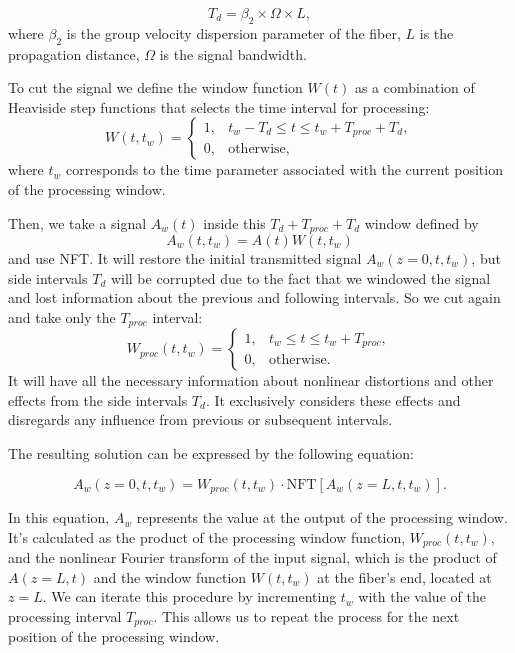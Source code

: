 \begin{equation}
    T_d = \beta_2 \times \Omega \times L {,}
\end{equation}
where $\beta_2$ is the group velocity dispersion parameter of the fiber, $L$ is the propagation distance, $\Omega$ is the signal bandwidth.

To cut the signal we define the window function $W(t)$ as a combination of Heaviside step functions that selects the time interval for processing:
\begin{equation}
W(t, t_w) = \begin{cases}
1, & t_w - T_d \leq t \leq t_w + T_{proc} + T_d, \\
0, & \text{otherwise} {,}
\end{cases}
\end{equation}
where $t_w$ corresponds to the time parameter associated with the current position of the processing window.

Then, we take a signal $A_w(t)$ inside this $T_d + T_{proc} + T_d$ window defined by 
\begin{equation}
    A_w(t, t_w) = A(t) W(t, t_w)
\label{eq:window}
\end{equation}
and use NFT. 
It will restore the initial transmitted signal $A_w(z = 0, t, t_w)$, but side intervals $T_d$ will be corrupted due to the fact that we windowed the signal and lost information about the previous and following intervals. So we cut again and take only the $T_{proc}$ interval:
\begin{equation}
W_{proc}(t, t_w) = \begin{cases}
1, & t_w \leq t \leq t_w + T_{proc}, \\
0, & \text{otherwise} {.}
\end{cases}
\end{equation}
It will have all the necessary information about nonlinear distortions and other effects from the side intervals $T_d$. It exclusively considers these effects and disregards any influence from previous or subsequent intervals.

The resulting solution can be expressed by the following equation:

\begin{equation}
A_w(z = 0, t, t_w) = W_{proc}(t, t_w) \cdot \mathrm{NFT}[A_w(z = L, t, t_w)] {.}
\end{equation}

In this equation, $A_w$ represents the value at the output of the processing window. It's calculated as the product of the processing window function, $W_{proc}(t, t_w)$, and the nonlinear Fourier transform of the input signal, which is the product of $A(z=L,t)$ and the window function $W(t, t_w)$ at the fiber's end, located at $z=L$. We can iterate this procedure by incrementing $t_w$ with the value of the processing interval $T_{proc}$. This allows us to repeat the process for the next position of the processing window.

